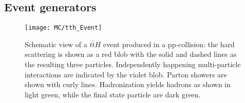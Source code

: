 \subsection{Event generators}

\begin{figure}[h]
\begin{center}
\texttt{[image: MC/tth\_Event]}
\end{center}
\caption{Schematic view of a $t\bar{t}H$ event produced in a pp-collision: the hard scattering is shown as a red blob with the solid and dashed lines as the resulting three particles.
Independently happening multi-particle interactions are indicated by the violet blob. 
Parton showers are shown with curly lines.
Hadronization yields hadrons as shown in light green, while the final state particle are dark green.
}
\label{fig:MC_ttH}
\end{figure}

